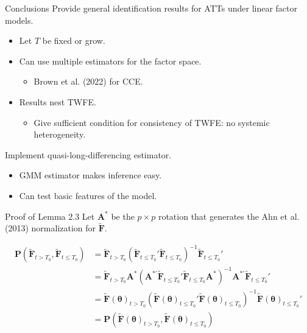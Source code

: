 \documentclass{beamer}
\newcommand{\1}{\mathds{1}} %
\begin{document}







\begin{frame}{Conclusions}
    Provide general identification results for ATTs under linear factor models. 
    \begin{itemize}
        \item Let $T$ be fixed or grow.
        \item Can use multiple estimators for the factor space. 
        \begin{itemize}
            \item Brown et al. (2022) for CCE.
        \end{itemize}
        \item Results nest TWFE. 
        \begin{itemize}
            \item Give sufficient condition for consistency of TWFE: no systemic heterogeneity.
        \end{itemize}
    \end{itemize}

    Implement quasi-long-differencing estimator. 
    \begin{itemize}
        \item GMM estimator makes inference easy. 
        \item Can test basic features of the model. 
    \end{itemize}

\end{frame}



\begin{frame}{Proof of Lemma 2.3}
\label{Lemma 2.3 proof}
Let $\bm A^*$ be the $p \times p$ rotation that generates the Ahn et al. (2013) normalization for $\tilde{\bm F}$.

\begin{align*}
        \bm P (\tilde{\bm F}_{t > T_0}, \tilde{\bm F}_{t \leq T_0}) 
        &= \tilde{\bm F}_{t > T_0} (\tilde{\bm F}_{t \leq T_0}' \tilde{\bm F}_{t \leq T_0})^{-1} \tilde{\bm F}_{t \leq T_0}' \\
        &= \tilde{\bm F}_{t > T_0} \bm A^* (\bm A^{*'} \tilde{\bm F}_{t \leq T_0}' \tilde{\bm F}_{t \leq T_0} \bm A^*)^{-1} \bm A^{*'} \tilde{\bm F}_{t \leq T_0}' \\
        &= \tilde{\bm F}( \bm \theta)_{t > T_0} (\tilde{\bm F}(\bm \theta)_{t \leq T_0}' \tilde{\bm F}(\bm \theta)_{t \leq T_0})^{-1} \tilde{\bm F}(\bm \theta)_{t \leq T_0}' \\
        &= \bm P(\tilde{\bm F}( \bm \theta)_{t > T_0}, \tilde{\bm F}(\bm \theta)_{t \leq T_0})
    \end{align*}

    \hyperlink{Lemma 2.3 proof back}{}
\end{frame}
\end{document}
